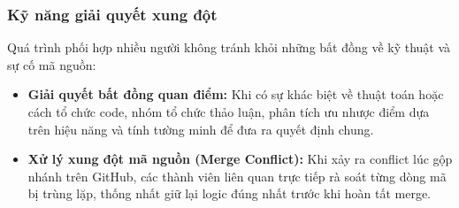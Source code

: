 \subsubsection{Kỹ năng giải quyết xung đột}
Quá trình phối hợp nhiều người không tránh khỏi những bất đồng về kỹ thuật và sự cố mã nguồn:
\begin{itemize}
    \item \textbf{Giải quyết bất đồng quan điểm:} Khi có sự khác biệt về thuật toán hoặc cách tổ chức code, nhóm tổ chức thảo luận, phân tích ưu nhược điểm dựa trên hiệu năng và tính tường minh để đưa ra quyết định chung.
    \item \textbf{Xử lý xung đột mã nguồn (Merge Conflict):} Khi xảy ra conflict lúc gộp nhánh trên GitHub, các thành viên liên quan trực tiếp rà soát từng dòng mã bị trùng lặp, thống nhất giữ lại logic đúng nhất trước khi hoàn tất merge.
\end{itemize}